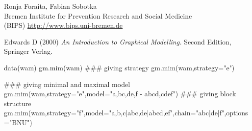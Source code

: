 \begin{Author}\relax
Ronja Foraita, Fabian Sobotka \\
Bremen Institute for Prevention Research and Social Medicine \\
(BIPS)  \url{http://www.bips.uni-bremen.de}
\end{Author}
\begin{References}\relax
Edwards D (2000) 
\emph{An Introduction to Graphical Modelling.}
Second Edition, Springer Verlag.
\end{References}
\begin{SeeAlso}\relax
{}
\end{SeeAlso}
\begin{Examples}
\begin{ExampleCode}
  data(wam)
  gm.mim(wam)
  ### giving strategy
  gm.mim(wam,strategy="e")
  
  ### giving minimal and maximal model
  gm.mim(wam,strategy="e",model="a,bc,de,f - abcd,cdef")
  ### giving block structure
  gm.mim(wam,strategy="f",model="a,b,c|abc,de|abcd,ef",chain="abc|de|f",options="BNU")
\end{ExampleCode}
\end{Examples}

